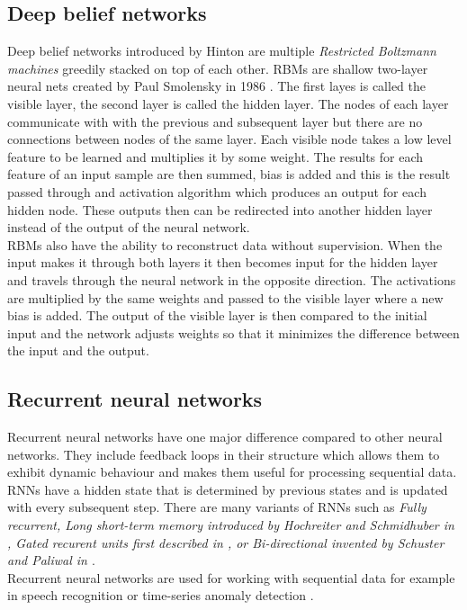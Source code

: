 \subsection{Deep belief networks}
Deep belief networks introduced by Hinton \cite{Hinton504} are multiple \textit{Restricted Boltzmann machines} greedily stacked on top of each other. RBMs are shallow two-layer neural nets created by Paul Smolensky in 1986 \cite{Smolensky1986InformationPI}. The first layes is called the visible layer, the second layer is called the hidden layer. The nodes of each layer communicate with with the previous and subsequent layer but there are no connections between nodes of the same layer. Each visible node takes a low level feature to be learned and multiplies it by some weight. The results for each feature of an input sample are then summed, bias is added and this is the result passed through and activation algorithm which produces an output for each hidden node. These outputs then can be redirected into another hidden layer instead of the output of the neural network. \\
RBMs also have the ability to reconstruct data without supervision. When the input makes it through both layers it then becomes input for the hidden layer and travels through the neural network in the opposite direction. The activations are multiplied by the same weights and passed to the visible layer where a new bias is added. The output of the visible layer is then compared to the initial input and the network adjusts weights so that it minimizes the difference between the input and the output.

\subsection{Recurrent neural networks}
Recurrent neural networks have one major difference compared to other neural networks. They include feedback loops in their structure which allows them to exhibit dynamic behaviour and makes them useful for processing sequential data. RNNs have a hidden state that is determined by previous states and is updated with every subsequent step. There are many variants of RNNs such as \textit{Fully recurrent, Long short-term memory introduced by Hochreiter and Schmidhuber in \cite{doi:10.1162/neco.1997.9.8.1735}, Gated recurent units first described in \cite{cho-etal-2014-learning}, or Bi-directional invented by Schuster and Paliwal in \cite{Schuster1997BidirectionalRN}}. \\
Recurrent neural networks are used for working with sequential data for example in speech recognition \cite{DBLP:journals/corr/abs-1303-5778} or time-series anomaly detection \cite{inproceedings_RNN_anomaly_detection}.


